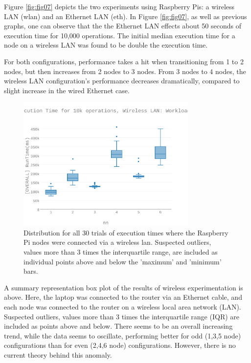 Figure \ref{fig:fig07} depicts the two experiments using Raspberry Pis: a wireless LAN (wlan) and an Ethernet LAN (eth).  In Figure \ref{fig:fig07}, as well as previous graphs, one can observe that the the Ethernet LAN effects about 50 seconds of execution time for 10,000 operations.  The initial median execution time for a node on a wireless LAN was found to be double the execution time.

For both configurations, performance takes a hit when transitioning from 1 to 2 nodes, but then increases from 2 nodes to 3 nodes.  From 3 nodes to 4 nodes, the wireless LAN configuration’s performance decreases dramatically, compared to slight increase in the wired Ethernet case.  

\begin{figure}[h]
\includegraphics[width=3.5in]{Figures/figures-wlc_fig8.pdf}

\caption{Distribution for all 30 trials of execution times where the Raspberry Pi nodes were connected via a wireless \gls{lan}.  Suspected outliers, values more than 3 times the interquartile range, are included as individual points above and below the 'maximum' and 'minimum' bars.}

\label{fig:fig08}
\end{figure}

A summary representation box plot of the results of wireless experimentation is above.  Here, the laptop was connected to the router via an Ethernet cable, and each node was connected to the router on a wireless local area network (LAN).  Suspected outliers, values more than 3 times the interquartile range (IQR) are included as points above and below.
There seems to be an overall increasing trend, while the data seems to oscillate, performing better for odd (1,3,5 node) configurations than for even (2,4,6 node) configurations.  However, there is no current theory behind this anomaly. 

